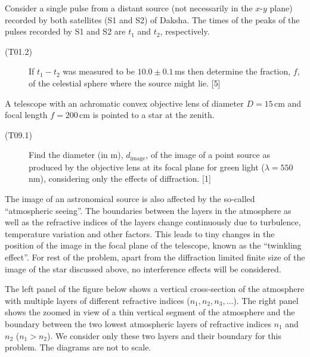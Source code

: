 Consider a single pulse from a distant source (not necessarily in the
$x$-$y$ plane) recorded by both satellites (S1 and S2) of Daksha. The times
of the peaks of the pulses recorded by S1 and S2 are $t_1$ and $t_2$,
respectively.

\begin{description}
\item[(T01.2)] If $t_1 - t_2$ was measured to be $10.0 \pm 0.1$\,ms then
  determine the fraction, $f$, of the celestial sphere where the source
  might lie. \hfill[5]
\end{description}

A telescope with an achromatic convex objective lens of diameter
$D = 15$\,cm and focal length $f = 200$\,cm is pointed to a star at the
zenith.

\begin{description}
\item[(T09.1)] Find the diameter (in m), $d_{\mathrm{image}}$, of the image
  of a point source as produced by the objective lens at its focal plane for
  green light ($\lambda = 550$\,nm), considering only the effects of
  diffraction. \hfill[1]
\end{description}

The image of an astronomical source is also affected by the so-called
``atmospheric seeing''. The boundaries between the layers in the atmosphere
as well as the refractive indices of the layers change continuously due to
turbulence, temperature variation and other factors. This leads to tiny
changes in the position of the image in the focal plane of the telescope,
known as the ``twinkling effect''. For rest of the problem, apart from the
diffraction limited finite size of the image of the star discussed above, no
interference effects will be considered.

The left panel of the figure below shows a vertical cross-section of the
atmosphere with multiple layers of different refractive indices
($n_1, n_2, n_3, \ldots$). The right panel shows the zoomed in view of a
thin vertical segment of the atmosphere and the boundary between the two
lowest atmospheric layers of refractive indices $n_1$ and $n_2$
($n_1 > n_2$). We consider only these two layers and their boundary for this
problem. The diagrams are not to scale.


